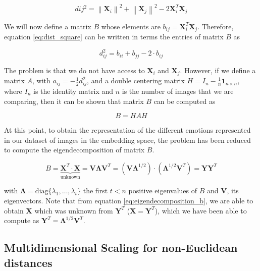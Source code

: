 \documentclass[11pt, a4paper]{article}
\numberwithin{equation}{subsection}
\begin{document}
\begin{equation}\label{eq:dist_square}
d{i j}^2=\left\|\mathbf{X}_i\right\|^2+\left\|\mathbf{X}_j\right\|^2-2 \mathbf{X}_i^T \mathbf{X}_j
\end{equation}

We will now define a matrix $B$ whose elements are $b_{ij} = \mathbf{X}_i^T\mathbf{X}_j$. Therefore, equation \eqref{eq:dist_square} can be written in terms the entries of matrix $B$ as

\begin{equation}
    d_{ij}^2 = b_{ii} + b_{jj} - 2\cdot b_{ij}
\end{equation}

The problem is that we do not have access to $\mathbf{X}_i$ and $\mathbf{X}_j$. However, if we define a matrix $A$, with $a_{ij} = -\frac{1}{2} d_{ij}^2$, and a double centering matrix $H = I_n - \frac{1}{n} \mathbf{1}_{n\times n}$, where $I_n$ is the identity matrix and $n$ is the number of images that we are comparing, then it can be shown that matrix $B$ can be computed as

\begin{equation}\label{eq:mat_B_definition}
    B = H A H
\end{equation}

At this point, to obtain the representation of the different emotions represented in our dataset of images in the embedding space, the problem has been reduced to compute the eigendecomposition of matrix $B$.

\begin{equation}\label{eq:eigendecomposition_b}
    B = \underbrace{\mathbf{X}^T \cdot \mathbf{X}}_{\text{unknown}} = \mathbf{V} \mathbf{\Lambda} \mathbf{V}^T = \left(\mathbf{V}\mathbf{\Lambda}^{1/2}\right) \cdot \left(\mathbf{\Lambda}^{1/2} \mathbf{V}^T\right) = \mathbf{Y}\mathbf{Y}^T
\end{equation}

with $\mathbf{\Lambda} = \text{diag}\{\lambda_1, \dots, \lambda_t\}$ the first $t < n$ positive eigenvalues of $B$ and $\mathbf{V}$, its eigenvectors. Note that from equation \eqref{eq:eigendecomposition_b}, we are able to obtain $\mathbf{X}$ which was unknown from $\mathbf{Y}^T$ ($\mathbf{X} = \mathbf{Y}^T$), which we have been able to compute as $\mathbf{Y}^T = \mathbf{\Lambda}^{1/2} \mathbf{V}^T$.

\subsection{Multidimensional Scaling for non-Euclidean distances}
\end{document}
